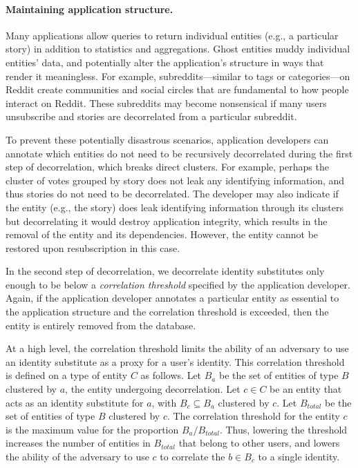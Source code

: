 \paragraph{Maintaining application structure.}
Many applications allow queries to return individual entities (e.g., a particular story) in addition
to statistics and aggregations. Ghost entities muddy individual entities' data, and potentially
alter the application's structure in ways that render it meaningless. For example,
subreddits---similar to tags or categories---on Reddit create communities and social circles 
that are fundamental to how people interact on Reddit.
These subreddits may become nonsensical if many users unsubscribe and stories are
decorrelated from a particular subreddit.

To prevent these potentially disastrous scenarios, application developers can annotate which
entities do not need to be recursively decorrelated during the first step of decorrelation, which
breaks direct clusters. For example, perhaps the cluster of votes grouped by story does not leak any
identifying information, and thus stories do not need to be decorrelated.  The developer may also
indicate if the entity (e.g., the
story) does leak identifying information through its clusters but decorrelating it would destroy
application integrity, which results in the removal of the entity and its dependencies.
However, the entity cannot be restored upon resubscription in this case.

In the second step of decorrelation, we decorrelate identity substitutes only enough to be below a
\emph{correlation threshold} specified by the application developer. Again, if the application
developer annotates a particular entity as essential to the application structure and the
correlation threshold is exceeded, then the entity is entirely removed from the database. 

At a high level, the correlation threshold limits the ability of an adversary to use an identity
substitute as a proxy for a user's identity.  This correlation threshold is defined on a type of
entity $C$ as follows. Let $B_a$ be the set of entities of type $B$ clustered by $a$, the entity
undergoing decorrelation.  Let $c \in C$ be an entity that acts as an identity substitute for $a$, with
$B_c \subseteq B_a$ clustered by $c$. Let $B_{total}$ be the set of entities of type $B$ clustered
by $c$. The correlation threshold for the entity $c$ is the maximum value for the proportion $B_a /
B_{total}$. Thus, lowering the threshold increases the number of entities in $B_{total}$ that belong
to other users, and lowers the ability of the adversary to use $c$ to correlate the $b \in B_{c}$ to
a single identity.

